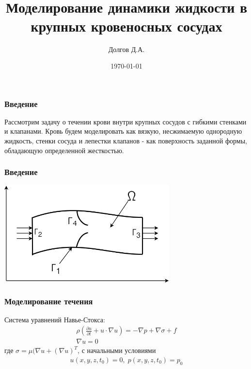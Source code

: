 \documentclass[14pt]{beamer}
\title[Моделирование динамики жидкости в сосудах]{Моделирование динамики жидкости в крупных кровеносных сосудах}
\date{\today}
\author{Долгов Д.А.}
\institute{Кемеровский Государственный Университет \\
    \vspace{0.7cm}
    \vspace{0.7cm}
}
\begin{document}
\maketitle

\begin{frame}
\frametitle{Введение}
Рассмотрим задачу о течении крови внутри крупных сосудов с гибкими стенками и клапанами. Кровь будем моделировать как вязкую, несжимаемую однородную жидкость, стенки сосуда и лепестки клапанов - как поверхность заданной формы, обладающую определенной жесткостью.
\end{frame}

\begin{frame}
\frametitle{Введение}
    \begin{center}
        \includegraphics[width=9cm]{area.png}
    \end{center}
\end{frame}

\begin{frame}
\frametitle{Моделирование течения}
Система уравнений Навье-Стокса:
\begin{gather}
    \label{eq:motion}
    \rho ( \frac{\partial u}{\partial t} + u \cdot \nabla u) = - \nabla p + \nabla \sigma + f\\
    \label{eq:continuity}
    \nabla u = 0 
\end{gather}
где $\sigma = \mu (\nabla u + (\nabla u)^{T}$, с начальными условиями
\begin{gather}
    u(x, y, z, t_0) = 0,\;p(x, y, z, t_0) = p_0
\end{gather}

\end{frame}
\end{document}
